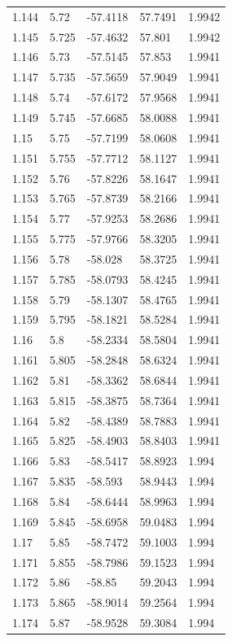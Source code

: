 \begin{tabular}{lllll}
1.144 & 5.72 & -57.4118 & 57.7491 & 1.9942 \\
1.145 & 5.725 & -57.4632 & 57.801 & 1.9942 \\
1.146 & 5.73 & -57.5145 & 57.853 & 1.9941 \\
1.147 & 5.735 & -57.5659 & 57.9049 & 1.9941 \\
1.148 & 5.74 & -57.6172 & 57.9568 & 1.9941 \\
1.149 & 5.745 & -57.6685 & 58.0088 & 1.9941 \\
1.15 & 5.75 & -57.7199 & 58.0608 & 1.9941 \\
1.151 & 5.755 & -57.7712 & 58.1127 & 1.9941 \\
1.152 & 5.76 & -57.8226 & 58.1647 & 1.9941 \\
1.153 & 5.765 & -57.8739 & 58.2166 & 1.9941 \\
1.154 & 5.77 & -57.9253 & 58.2686 & 1.9941 \\
1.155 & 5.775 & -57.9766 & 58.3205 & 1.9941 \\
1.156 & 5.78 & -58.028 & 58.3725 & 1.9941 \\
1.157 & 5.785 & -58.0793 & 58.4245 & 1.9941 \\
1.158 & 5.79 & -58.1307 & 58.4765 & 1.9941 \\
1.159 & 5.795 & -58.1821 & 58.5284 & 1.9941 \\
1.16 & 5.8 & -58.2334 & 58.5804 & 1.9941 \\
1.161 & 5.805 & -58.2848 & 58.6324 & 1.9941 \\
1.162 & 5.81 & -58.3362 & 58.6844 & 1.9941 \\
1.163 & 5.815 & -58.3875 & 58.7364 & 1.9941 \\
1.164 & 5.82 & -58.4389 & 58.7883 & 1.9941 \\
1.165 & 5.825 & -58.4903 & 58.8403 & 1.9941 \\
1.166 & 5.83 & -58.5417 & 58.8923 & 1.994 \\
1.167 & 5.835 & -58.593 & 58.9443 & 1.994 \\
1.168 & 5.84 & -58.6444 & 58.9963 & 1.994 \\
1.169 & 5.845 & -58.6958 & 59.0483 & 1.994 \\
1.17 & 5.85 & -58.7472 & 59.1003 & 1.994 \\
1.171 & 5.855 & -58.7986 & 59.1523 & 1.994 \\
1.172 & 5.86 & -58.85 & 59.2043 & 1.994 \\
1.173 & 5.865 & -58.9014 & 59.2564 & 1.994 \\
1.174 & 5.87 & -58.9528 & 59.3084 & 1.994 \\

\end{tabular}
